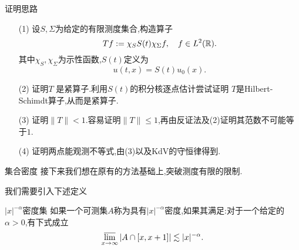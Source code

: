 \begin{frame}[t]{证明思路}

\begin{enumerate}
  \item [(1)] 设$S,\Sigma$为给定的有限测度集合,构造算子
    \begin{equation}
      Tf:=\chi_{S} S(t)\chi_{\Sigma}f ,\quad f\in L^2(\mathbb{R}). 
    \end{equation}
    其中$\chi_S,\chi_\Sigma$为示性函数,$S(t)$定义为
   \begin{equation}
     u(t,x)=S(t)u_0(x).
   \end{equation}
\item [(2)] 证明$T$ 是紧算子.利用$S(t)$的积分核逐点估计尝试证明 $T$是Hilbert-Schimdt算子,从而是紧算子.
\item [(3)] 证明$\|T\|<1$.容易证明$\|T\|\le 1$,再由反证法及(2)证明其范数不可能等于$1$.
\item [(4)]  证明两点能观测不等式,由(3)以及KdV的守恒律得到.
\end{enumerate} 
\end{frame}
\iffalse
\begin{frame}[t]
  The strategy to prove (\ref{7}) is to construct the operator
  \begin{equation}\label{8}
    Tf := \chi_{S}S(-t)\left( \chi_{\Sigma}S(t)f \right).  
  \end{equation}
  and claim that $T$ is a compact operator and $\|T\|<1$.

 \begin{equation}
   Tf(x)=\int \chi_{S}(x)\left( \int E(-t,x-w)\chi_\Sigma(w) E(t,w-y)\,\mathrm{d}w \right) f(y)\,\mathrm{d}y.
 \end{equation}
 Define $K(x,y)=\chi_S(x)\int E(-t,x-w)\chi_{\Sigma}(w)E(t,w-y)\,\mathrm{d}w $. Then 
\begin{equation}
  Tf(x)= \int K(x,y)f(y)\,\mathrm{d}y.
\end{equation}

\end{frame}
\fi
\begin{frame}[t]{集合密度}
  接下来我们想在原有的方法基础上,突破测度有限的限制.

  我们需要引入下述定义
  \begin{block}{$|x|^{-\alpha}$密度集}
    如果一个可测集$A$称为具有$|x|^{-\alpha}$密度,如果其满足:对于一个给定的$\alpha>0$,有下式成立
    \begin{equation}
      \varlimsup_{x\to \infty}|A\cap [x,x+1]|\lesssim|x|^{-\alpha}.
    \end{equation}
  \end{block}
\end{frame}

